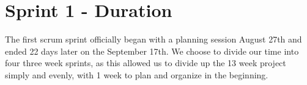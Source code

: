 \section{Sprint 1 - Duration}
The first scrum sprint officially began with a planning session August 27th and ended 22 days later on the September 17th. We choose to divide our time into four three week sprints, as this allowed us to divide up the 13 week project simply and evenly, with 1 week to plan and organize in the beginning.